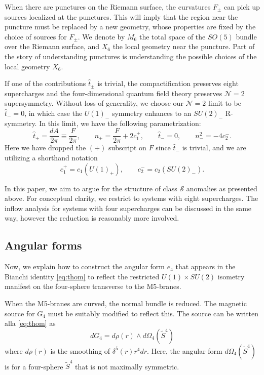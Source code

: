 \documentclass[a4paper,11pt]{article}
\begin{document}
When there are punctures on the Riemann surface, the curvatures $F_\pm$ can pick up sources localized at the punctures. This will imply that the region near the puncture must be replaced by a new geometry, whose properties are fixed by the choice of sources for $F_\pm$.  We denote by ${M}_6$ the total space of the $SO(5)$ bundle over the Riemann surface, and $X_6$ the local geometry near the puncture. Part of the story of understanding punctures is understanding the possible choices of the local geometry $X_6$. 


If one of the contributions $\hat{t}_\pm$ is trivial, the compactification preserves eight supercharges and the four-dimensional quantum field theory preserves $\mathcal{N}=2$ supersymmetry.  Without loss of generality, we choose our $\mathcal{N}=2$ limit to be $\hat{t}_- =0$, in which case the $U(1)_-$ symmetry enhances to an $SU(2)_-$ R-symmetry.  In this limit, we have the following parametrization:
\begin{equation}
\hat{t}_+ = \frac{d A}{2\pi}  \equiv \frac{F}{2\pi} , \qquad n_+ = \frac{F}{2\pi}+ 2 c_1^+, \qquad \hat{t}_-=0, \qquad n_-^2 = -4 c_2^-.  \label{eq:N2con}
\end{equation} Here we have dropped the $(+)$ subscript on $F$ since $\hat{t}_-$ is trivial, and we are utilizing a shorthand notation
\begin{equation}
c_1^+ = c_1(U(1)_+), \qquad c_2^- = c_2(SU(2)_-).
\end{equation}

In this paper, we aim to argue for the structure of class $\mathcal{S}$ anomalies as presented above.  For conceptual clarity, we restrict to systems with eight supercharges.  The inflow analysis for systems with four supercharges can be discussed in the same way, however the reduction is reasonably more involved.  






\subsection*{Angular forms} 

Now, we explain how to construct the angular form $e_4$ that appears in the Bianchi identity \eqref{eq:thom} to reflect the restricted $U(1)\times SU(2)$ isometry manifest on the four-sphere transverse to the M5-branes.

When the M5-branes are curved, the normal bundle is reduced.  The magnetic source for $G_4$ must be suitably modified to reflect this.  The source can be written alla \eqref{eq:thom} as
\begin{equation}
d G_4 = d\rho(r) \wedge d \Omega_4 (\widetilde{S}^4)
\end{equation} where $d\rho(r)$ is the smoothing of $\delta^5(r)r^4 dr$.  Here, the angular form $d\Omega_4(\widetilde{S}^4)$ is for a four-sphere $\widetilde{S}^4$ that is not maximally symmetric.  
\end{document}

